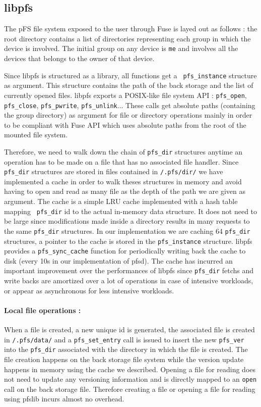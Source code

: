 \subsection {libpfs}

The pFS file system exposed to the user through Fuse is layed out as
follows : the root directory contains a list of directories
representing each group in which the device is involved. The initial
group on any device is {\tt me} and involves all the devices that
belongs to the owner of that device.

Since libpfs is structured as a library, all functions get a {\tt
  pfs\_instance} structure as argument. This structure contains the path
of the back storage and the list of currently opened files. libpfs
exports a POSIX-like file system API : {\tt pfs\_open}, {\tt
  pfs\_close}, {\tt pfs\_pwrite}, {\tt pfs\_unlink}... These calls get
absolute paths (containing the group directory) as argument for file
or directory operations mainly in order to be compliant with Fuse API
which uses absolute paths from the root of the mounted file system.

Therefore, we need to walk down the chain of {\tt pfs\_dir} structures
anytime an operation has to be made on a file that has no associated
file handler. Since {\tt pfs\_dir} structures are stored in files
contained in {\tt /.pfs/dir/} we have implemented a cache in order to
walk theses structures in memory and avoid having to open and read as
many file as the depth of the path we are given as argument. The cache
is a simple LRU cache implemented with a hash table mapping {\tt
  pfs\_dir} id to the actual in-memory data structure. It does not
need to be large since modifications made inside a directory results in
many requests to the same {\tt pfs\_dir} structures. In our
implementation we are caching 64 {\tt pfs\_dir} structures, a pointer
to the cache is stored in the {\tt pfs\_instance} structure. libpfs
provides a {\tt pfs\_sync\_cache} function for periodically writing
back the cache to disk (every 10s in our implementation of pfsd). The
cache has incurred an important improvement over the performances of
libpfs since {\tt pfs\_dir} fetchs and write backs are amortized over
a lot of operations in case of intensive workloads, or appear as
asynchronous for less intensive workloads.

\paragraph{Local file operations :}
When a file is created, a new unique id is generated, the associated
file is created in {\tt /.pfs/data/} and a {\tt pfs\_set\_entry} call
is issued to insert the new {\tt pfs\_ver} into the {\tt pfs\_dir}
associated with the directory in which the file is created. The file
creation happens on the back storage file system while the version
update happens in memory using the cache we described. Opening a file
for reading does not need to update any versioning information and is
directly mapped to an {\tt open} call on the back storage file. Therefore
creating a file or opening a file for reading using pfslib incurs
almost no overhead. 

